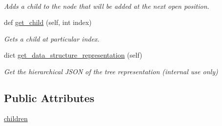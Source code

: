 \begin{DoxyCompactItemize}
$$\begin{DoxyCompactList}\small\item\em Adds a child to the node that will be added at the next open position. \end{DoxyCompactList}\item 
def \mbox{\hyperlink{classbridges_1_1tree__element_1_1_tree_element_a333d920ece1c481b9063ca68401e425b}{get\+\_\+child}} (self, int index)
\begin{DoxyCompactList}\small\item\em Gets a child at particular index. \end{DoxyCompactList}\item 
dict \mbox{\hyperlink{classbridges_1_1tree__element_1_1_tree_element_a498e573b1a711204162d348f315eaeee}{get\+\_\+data\+\_\+structure\+\_\+representation}} (self)
\begin{DoxyCompactList}\small\item\em Get the hierarchical J\+S\+ON of the tree representation (internal use only) \end{DoxyCompactList}\end{DoxyCompactItemize}
\subsection*{Public Attributes}
\begin{DoxyCompactItemize}
\item 
\mbox{\hyperlink{classbridges_1_1tree__element_1_1_tree_element_a09e0e8ad32395e004b6b2d12c39ce390}{children}}
\end{DoxyCompactItemize}
